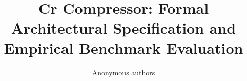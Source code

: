 \title{\textbf{Cr Compressor: Formal Architectural Specification and Empirical Benchmark Evaluation}}

\author{Anonymous authors}
